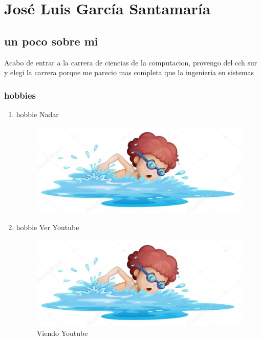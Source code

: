 \chapter{José Luis García Santamaría}

\section{un poco sobre mi}
Acabo de entrar a la carrera de ciencias de la computacion, provengo del cch sur y elegi la carrera porque me parecio mas completa que la ingenieria en sistemas

\subsection{hobbies}
\begin{enumerate}

\item hobbie Nadar

  \begin{figure}[h]
    \centering
    \includegraphics[scale=0.5]{IMG/17.jpg}
  \end{figure}

\item hobbie Ver Youtube

  \begin{figure}[h]
    \centering
    \includegraphics[scale=0.5]{IMG/17.jpg}
    \caption{Viendo Youtube}
  \end{figure}
  

\end{enumerate}
